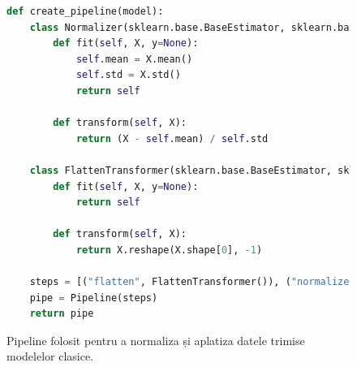 \begin{figure}
\begin{lstlisting}[language=Python]
def create_pipeline(model):
    class Normalizer(sklearn.base.BaseEstimator, sklearn.base.TransformerMixin):
        def fit(self, X, y=None):
            self.mean = X.mean()
            self.std = X.std()
            return self

        def transform(self, X):
            return (X - self.mean) / self.std

    class FlattenTransformer(sklearn.base.BaseEstimator, sklearn.base.TransformerMixin):
        def fit(self, X, y=None):
            return self

        def transform(self, X):
            return X.reshape(X.shape[0], -1)

    steps = [("flatten", FlattenTransformer()), ("normalize", Normalizer()), ("scaler", sklearn.preprocessing.StandardScaler()), ("model", model)]
    pipe = Pipeline(steps)
    return pipe
\end{lstlisting}
\caption{Pipeline folosit pentru a normaliza și aplatiza datele trimise modelelor clasice.}
\label{fig:pipeline_modele_clasice}
\end{figure}